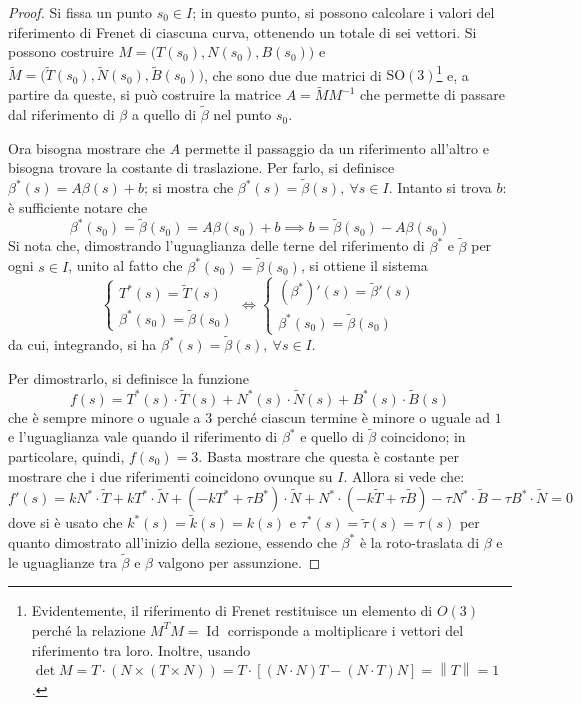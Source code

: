 \documentclass[12pt]{scrartcl}
\theoremstyle{style}
\numberwithin{equation}{subsection}
\begin{document}
\begin{proof}
	Si fissa un punto $s_0 \in I$; in questo punto, si possono calcolare i valori del riferimento di Frenet di ciascuna curva, ottenendo un totale di sei vettori.
	Si possono costruire $M=\big(T(s_0), N(s_0),B(s_0)\big)$ e $\widetilde{M}=\big(\widetilde{T}(s_0),\widetilde{N}(s_0),\widetilde{B}(s_0)\big) $, che sono due  due matrici di $\mathrm{SO}(3) $\footnote{Evidentemente, il riferimento di Frenet restituisce un elemento di $O(3)$ perch\'e la relazione $M^T M = \operatorname{Id} $ corrisponde a moltiplicare i vettori del riferimento tra loro. Inoltre, usando $\det M = T \cdot (N \times (T \times N)) = T\cdot [(N\cdot N)T-(N\cdot T)N]=\left\lVert T \right\rVert =1$.} e, a partire da queste, si pu\`o costruire la matrice $A = \widetilde{M}M^{-1}$ che permette di passare dal riferimento di $\beta $ a quello di $\widetilde{\beta }$ nel punto $s_0$.

	Ora bisogna mostrare che $A$ permette il passaggio da un riferimento all'altro e bisogna trovare la costante di traslazione.
	Per farlo, si definisce $\beta ^*(s) = A\beta (s) + b$; si mostra che $\beta ^*(s) = \widetilde{\beta }(s), \ \forall s \in I$.
	Intanto si trova $b$: \`e sufficiente notare che
	\[
	\beta ^*(s_0) = \widetilde{\beta }(s_0) = A \beta (s_0) + b \implies b = \widetilde{\beta }(s_0) - A \beta (s_0)
	\] 
Si nota che, dimostrando l'uguaglianza delle terne del riferimento di $\beta ^*$ e $\widetilde{\beta }$ per ogni $s \in I$, unito al fatto che $\beta ^*(s_0) = \widetilde{\beta }(s_0)$, si ottiene il sistema
\[
\begin{cases}
	T^*(s) = \widetilde{T}(s)\\
	\beta ^*(s_0) = \widetilde{\beta }(s_0)
\end{cases}\iff \begin{cases}
(\beta ^*)'(s) = \widetilde{\beta }'(s)\\
	\beta ^*(s_0) = \widetilde{\beta }(s_0)
\end{cases}
\] 
da cui, integrando, si ha $\beta ^*(s) = \widetilde{\beta} (s), \ \forall s \in I$.

Per dimostrarlo, si definisce la funzione
\[
f(s) = T^*(s) \cdot \widetilde{T}(s) + N^*(s) \cdot \widetilde{N}(s) + B^*(s) \cdot \widetilde{B}(s)
\] 
che \`e sempre minore o uguale a $3$ perch\'e ciascun termine \`e minore o uguale ad $1$ e l'uguaglianza vale quando il riferimento di $\beta ^*$ e quello di $\widetilde{\beta }$ coincidono; in particolare, quindi, $f(s_0) = 3$.
Basta mostrare che questa \`e costante per mostrare che i due riferimenti coincidono ovunque su $I$.
Allora si vede che:
\[
f'(s) = k N^* \cdot \widetilde{T} + k T^* \cdot \widetilde{N} +(-kT^*+\tau B^*)\cdot  \widetilde{N} + N^* \cdot (-k\widetilde{T}+\tau \widetilde{B}) - \tau N^* \cdot \widetilde{B}- \tau B^*\cdot \widetilde{N}=0
\] 
dove si \`e usato che $k^*(s) = \widetilde{k}(s) = k(s)$ e $\tau ^*(s) = \widetilde{\tau }(s) = \tau (s)$ per quanto dimostrato all'inizio della sezione, essendo che $\beta ^*$ \`e la roto-traslata di $\beta $ e le uguaglianze tra $\widetilde{\beta }$ e $\beta $ valgono per assunzione.
\end{proof}
\end{document}
